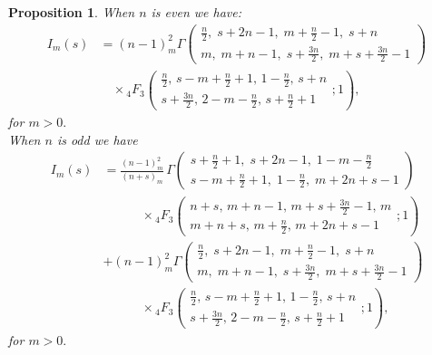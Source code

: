 \documentclass[10pt,a4paper]{amsart}
\newtheorem{proposition}{Proposition}
\begin{document}
  \begin{proposition}\label{Pro 3.1}
      When $n$ is even we have:
      \begin{align} \label{sude}
I_m(s) &= (n-1)_m^2  \Gamma\!\left(
\begin{matrix}
\frac{n}{2},\; s+2n-1,\; m+\frac{n}{2}-1,\; s+n
\\
m,\; m+n-1,\; s+\frac{3n}{2},\; m+s+\frac{3n}{2}-1
\end{matrix}
\right) \nonumber \\[3. pt]
&\quad \times {}_4F_3 \left( \begin{matrix} \frac{n}{2}, \, s - m + \frac{n}{2} + 1, \, 1 - \frac{n}{2}, \, s + n \\ s + \frac{3n}{2}, \, 2 - m - \frac{n}{2}, \, s + \frac{n}{2} + 1 \end{matrix} ; 1 \right),
      \end{align}
      for $m >0.$\\
      When $n$ is odd we have 
\begin{align} 
I_m(s) &= \frac{(n-1)_m^2}{(n+s)_m}\,
\Gamma\!\left(
\begin{matrix}
s+\frac{n}{2}+1,\; s+2n-1,\; 1-m-\frac{n}{2}
\\
s-m+\frac{n}{2}+1,\; 1-\frac{n}{2},\; m+2n+s-1
\end{matrix}
\right) \label{liche} \\[3. pt]
&\qquad \quad \times {}_4F_3 \left( \begin{matrix} n + s, \, m + n - 1, \, m + s + \frac{3n}{2} - 1, \, m \\ m + n + s, \, m + \frac{n}{2}, \, m + 2n + s - 1 \end{matrix} ; 1 \right) \nonumber \\[1em]
& + (n-1)_m^2  \Gamma\!\left(
\begin{matrix}
\frac{n}{2},\; s+2n-1,\; m+\frac{n}{2}-1,\; s+n
\\
m,\; m+n-1,\; s+\frac{3n}{2},\; m+s+\frac{3n}{2}-1
\end{matrix}
\right) \nonumber \\[3. pt]
&\qquad \quad \times {}_4F_3 \left( \begin{matrix} \frac{n}{2}, \, s - m + \frac{n}{2} + 1, \, 1 - \frac{n}{2}, \, s + n \\ s + \frac{3n}{2}, \, 2 - m - \frac{n}{2}, \, s + \frac{n}{2} + 1 \end{matrix} ; 1 \right) \nonumber,
\end{align}
for $m >0.$
  \end{proposition}
\end{document}
